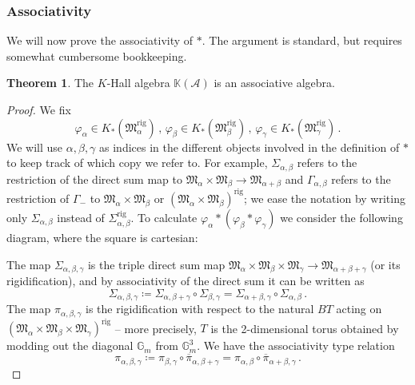 \documentclass[12pt]{amsart}
\theoremstyle{definition}
\newtheorem{theorem}[definition]{Theorem}
\newcommand{\BG}{{\mathbb{G}}}
\newcommand{\BK}{{\mathbb{K}}}
\newcommand{\CA}{{\mathcal A}}
\newcommand{\1}{\mathbf 1}
\newcommand{\FM}{{\mathfrak{M}}}
\newcommand{\rig}{\mathrm{rig}}
\begin{document}
\subsubsection{Associativity}\label{subsec: associativity}
We will now prove the associativity of $\ast$. The argument is standard, but requires somewhat cumbersome bookkeeping.

\begin{theorem}\label{thm: associativity}
    The $K$-Hall algebra $\BK(\CA)$ is an associative algebra.
\end{theorem}
\begin{proof}
We fix
\[\varphi_\alpha\in K_\ast(\FM^\rig_\alpha)\,,\,\varphi_\beta\in K_\ast(\FM^\rig_\beta)\,,\,\varphi_\gamma\in K_\ast(\FM^\rig_\gamma)\,.\]
We will use $\alpha, \beta, \gamma$ as indices in the different objects involved in the definition of $\ast$ to keep track of which copy we refer to. For example, $\Sigma_{\alpha, \beta}$ refers to the restriction of the direct sum map to $\FM_\alpha\times \FM_\beta\to \FM_{\alpha+\beta}$ and $\Gamma_{\alpha, \beta}$ refers to the restriction of $\Gamma_-$ to $\FM_\alpha\times \FM_\beta$ or $(\FM_\alpha\times \FM_\beta)^\rig$; we ease the notation by writing only $\Sigma_{\alpha, \beta}$ instead of $\Sigma^\rig_{\alpha, \beta}$. To calculate $\varphi_\alpha\ast(\varphi_\beta\ast \varphi_\gamma)$ we consider the following diagram, where the square is cartesian:
\begin{center}
\end{center}
The map $\Sigma_{\alpha, \beta, \gamma}$ is the triple direct sum map $\FM_{\alpha}\times \FM_\beta\times \FM_\gamma\to \FM_{\alpha+ \beta+ \gamma}$ (or its rigidification), and by associativity of the direct sum it can be written as
\[\Sigma_{\alpha, \beta, \gamma}\coloneqq \Sigma_{\alpha, \beta+\gamma}\circ \Sigma_{\beta,\gamma}=\Sigma_{\alpha+\beta, \gamma}\circ\Sigma_{\alpha, \beta}\,.\]
The map $\pi_{\alpha, \beta, \gamma}$ is the rigidification with respect to the natural $BT$ acting on  $(\FM_\alpha\times \FM_\beta\times \FM_\gamma)^\rig$ -- more precisely, $T$ is the 2-dimensional torus obtained by modding out the diagonal $\BG_m$ from $\BG_m^3$. We have the associativity type relation
\[\pi_{\alpha, \beta, \gamma}\coloneqq \pi_{\beta, \gamma}\circ \overline \pi_{\alpha, \beta+\gamma}=\pi_{\alpha, \beta}\circ \overline \pi_{\alpha+\beta, \gamma}\,.\]


\end{proof}
\end{document}
